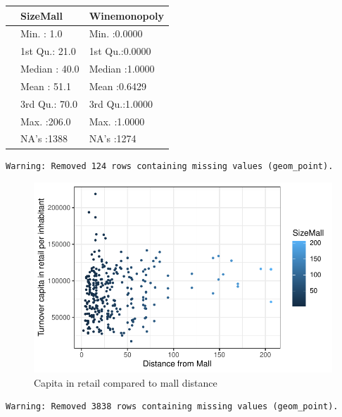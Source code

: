 \documentclass[
  10,
  a4paper,
]{article}
\begin{document}
\begin{tabular}{l|l|l}
\hline
  &    SizeMall &  Winemonopoly\\
\hline
 & Min.   :  1.0 & Min.   :0.0000\\
\hline
 & 1st Qu.: 21.0 & 1st Qu.:0.0000\\
\hline
 & Median : 40.0 & Median :1.0000\\
\hline
 & Mean   : 51.1 & Mean   :0.6429\\
\hline
 & 3rd Qu.: 70.0 & 3rd Qu.:1.0000\\
\hline
 & Max.   :206.0 & Max.   :1.0000\\
\hline
 & NA's   :1388 & NA's   :1274\\
\hline
\end{tabular}

\begin{verbatim}
Warning: Removed 124 rows containing missing values (geom_point).
\end{verbatim}

\begin{figure}

{\centering \includegraphics{Retail-Agglomeration_abstract_introduction_theori_econometric_approach_files/figure-pdf/fig-1-1.pdf}

}

\caption{\label{fig-1}Capita in retail compared to mall distance}

\end{figure}

\begin{verbatim}
Warning: Removed 3838 rows containing missing values (geom_point).
\end{verbatim}
\end{document}
